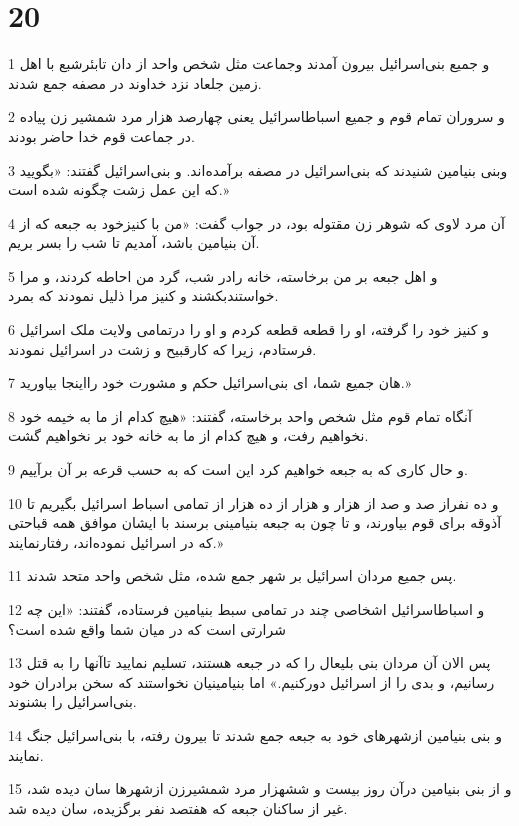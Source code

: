 \chapter{20}

\par 1 و جمیع بنی‌اسرائیل بیرون آمدند وجماعت مثل شخص واحد از دان تابئرشبع با اهل زمین جلعاد نزد خداوند در مصفه جمع شدند.
\par 2 و سروران تمام قوم و جمیع اسباطاسرائیل یعنی چهارصد هزار مرد شمشیر زن پیاده در جماعت قوم خدا حاضر بودند.
\par 3 وبنی بنیامین شنیدند که بنی‌اسرائیل در مصفه برآمده‌اند. و بنی‌اسرائیل گفتند: «بگویید که این عمل زشت چگونه شده است.»
\par 4 آن مرد لاوی که شوهر زن مقتوله بود، در جواب گفت: «من با کنیزخود به جبعه که از آن بنیامین باشد، آمدیم تا شب را بسر بریم.
\par 5 و اهل جبعه بر من برخاسته، خانه رادر شب، گرد من احاطه کردند، و مرا خواستندبکشند و کنیز مرا ذلیل نمودند که بمرد.
\par 6 و کنیز خود را گرفته، او را قطعه قطعه کردم و او را درتمامی ولایت ملک اسرائیل فرستادم، زیرا که کارقبیح و زشت در اسرائیل نمودند.
\par 7 هان جمیع شما، ای بنی‌اسرائیل حکم و مشورت خود رااینجا بیاورید.»
\par 8 آنگاه تمام قوم مثل شخص واحد برخاسته، گفتند: «هیچ کدام از ما به خیمه خود نخواهیم رفت، و هیچ کدام از ما به خانه خود بر نخواهیم گشت.
\par 9 و حال کاری که به جبعه خواهیم کرد این است که به حسب قرعه بر آن برآییم.
\par 10 و ده نفراز صد و صد از هزار و هزار از ده هزار از تمامی اسباط اسرائیل بگیریم تا آذوقه برای قوم بیاورند، و تا چون به جبعه بنیامینی برسند با ایشان موافق همه قباحتی که در اسرائیل نموده‌اند، رفتارنمایند.»
\par 11 پس جمیع مردان اسرائیل بر شهر جمع شده، مثل شخص واحد متحد شدند.
\par 12 و اسباطاسرائیل اشخاصی چند در تمامی سبط بنیامین فرستاده، گفتند: «این چه شرارتی است که در میان شما واقع شده است؟
\par 13 پس الان آن مردان بنی بلیعال را که در جبعه هستند، تسلیم نمایید تاآنها را به قتل رسانیم، و بدی را از اسرائیل دورکنیم.» اما بنیامینیان نخواستند که سخن برادران خود بنی‌اسرائیل را بشنوند.
\par 14 و بنی بنیامین ازشهرهای خود به جبعه جمع شدند تا بیرون رفته، با بنی‌اسرائیل جنگ نمایند.
\par 15 و از بنی بنیامین درآن روز بیست و ششهزار مرد شمشیرزن ازشهرها سان دیده شد، غیر از ساکنان جبعه که هفتصد نفر برگزیده، سان دیده شد.

